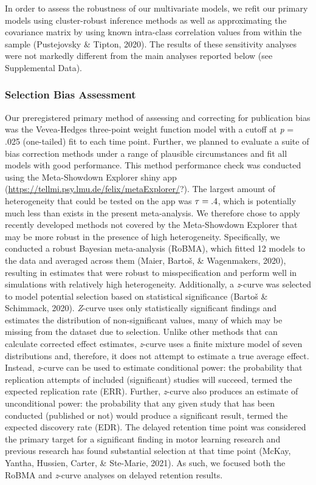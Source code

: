 \documentclass[
  english,
  man,mask,floatsintext]{apa7}
\begin{document}
In order to assess the robustness of our multivariate models, we refit our primary models using cluster-robust inference methods as well as approximating the covariance matrix by using known intra-class correlation values from within the sample (Pustejovsky \& Tipton, 2020). The results of these sensitivity analyses were not markedly different from the main analyses reported below (see Supplemental Data).

\hypertarget{selection-bias-assessment}{%
\subsubsection{Selection Bias Assessment}\label{selection-bias-assessment}}

Our preregistered primary method of assessing and correcting for publication bias was the Vevea-Hedges three-point weight function model with a cutoff at \emph{p} = .025 (one-tailed) fit to each time point. Further, we planned to evaluate a suite of bias correction methods under a range of plausible circumstances and fit all models with good performance. This method performance check was conducted using the Meta-Showdown Explorer shiny app (\url{https://tellmi.psy.lmu.de/felix/metaExplorer/}?). The largest amount of heterogeneity that could be tested on the app was \(\small\tau = .4\), which is potentially much less than exists in the present meta-analysis. We therefore chose to apply recently developed methods not covered by the Meta-Showdown Explorer that may be more robust in the presence of high heterogeneity. Specifically, we conducted a robust Bayesian meta-analysis (RoBMA), which fitted 12 models to the data and averaged across them (Maier, Bartoš, \& Wagenmakers, 2020), resulting in estimates that were robust to misspecification and perform well in simulations with relatively high heterogeneity. Additionally, a \emph{z}-curve was selected to model potential selection based on statistical significance (Bartoš \& Schimmack, 2020). \emph{Z}-curve uses only statistically significant findings and estimates the distribution of non-significant values, many of which may be missing from the dataset due to selection. Unlike other methods that can calculate corrected effect estimates, \emph{z}-curve uses a finite mixture model of seven distributions and, therefore, it does not attempt to estimate a true average effect. Instead, \emph{z}-curve can be used to estimate conditional power: the probability that replication attempts of included (significant) studies will succeed, termed the expected replication rate (ERR). Further, \emph{z}-curve also produces an estimate of unconditional power: the probability that any given study that has been conducted (published or not) would produce a significant result, termed the expected discovery rate (EDR). The delayed retention time point was considered the primary target for a significant finding in motor learning research and previous research has found substantial selection at that time point (McKay, Yantha, Hussien, Carter, \& Ste-Marie, 2021). As such, we focused both the RoBMA and \emph{z}-curve analyses on delayed retention results.
\end{document}
